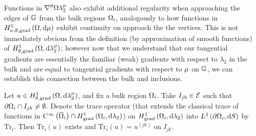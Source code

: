 Functions in $\nabla^{\theta}{\Omega}{\lambda_2^{\mu}}$ also exhibit additional regularity when approaching the edges of $\mathbb{G}$ from the bulk regions $\Omega_i$, analogously to how functions in $H^1_{\kappa,\theta,\mathrm{grad}}\left( \Omega, \mathrm{d}\mu \right)$ exhibit continuity on approach the the vertices.
This is not immediately obvious from the definition (by approximation of smooth functions) of $H^1_{\theta, \mathrm{grad}}\left( \Omega, \mathrm{d}\lambda_2^{\mu} \right)$; however now that we understand that our tangential gradients are essentially the familiar (weak) gradients with respect to $\lambda_2$ in the bulk and are equal to tangential gradients with respect to $\mu$ on $\mathbb{G}$, we can establish this connection between the bulk and inclusions.
\begin{theorem} \label{thm:SI-SobFuncEdgeContinuity}
	Let $u\in H^1_{\theta, \mathrm{grad}}\left( \Omega, \mathrm{d}\lambda_2^{\mu} \right)$, and fix a bulk region $\Omega_i$.
	Take $I_{jk}\in\mathcal{E}$ such that $\partial\Omega_i\cap I_{jk}\neq\emptyset$.
	Denote the trace operator (that extends the classical trace of functions in $C^{\infty}\left( \overline{\Omega}_i \right)\cap H^1_\mathrm{grad}\left( \Omega_i, \mathrm{d}\lambda_2 \right)$) on $H^1_\mathrm{grad}\left( \Omega_i, \mathrm{d}\lambda_2 \right)$ into $L^{2}\left( \partial\Omega_i,\mathrm{d} S \right)$ by $\mathrm{Tr}_i$.
	Then $\mathrm{Tr}_i(u)$ exists and $\mathrm{Tr}_i(u) = u^{(jk)}$ on $I_{jk}$.
\end{theorem}
